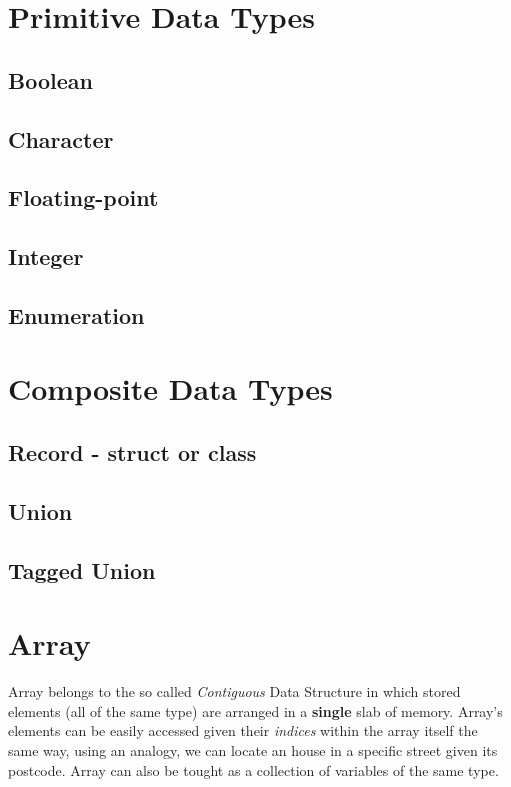 
\chapter{Primitive Data Types}

\section{Boolean}
\iffalse
https://oopscenities.net/2011/09/28/c-primitive-types/
https://en.wikipedia.org/wiki/Primitive_data_type
http://rypress.com/tutorials/objective-c/data-types/primitives
https://en.wikipedia.org/wiki/C_data_types
\fi
\section{Character}

\section{Floating-point}

\section{Integer}

\section{Enumeration}


\chapter{Composite Data Types}
\section{Record - struct or class}
\section{Union}
\section{Tagged Union}


\chapter{Array}
Array belongs to the so called \textit{Contiguous} Data Structure in which stored elements (all of the same type) are arranged in a \textbf{single} slab of memory. Array's elements can be easily  accessed given their \textit{indices} within the array itself the same way, using an analogy, we can locate an house in a specific street given its postcode. Array can also be tought as a collection of variables of the same type.

